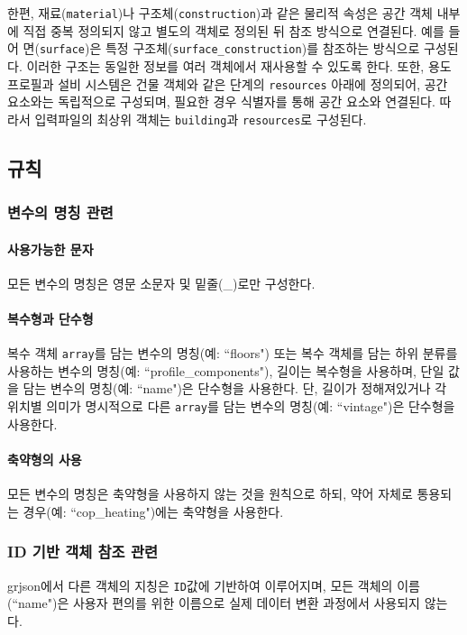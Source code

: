 한편, 재료(\texttt{material})나 구조체(\texttt{construction})과 같은 물리적 속성은 공간 객체 내부에 직접 중복 정의되지 않고 별도의 객체로 정의된 뒤 참조 방식으로 연결된다. 예를 들어 면(\texttt{surface})은 특정 구조체(\texttt{surface\_construction})를 참조하는 방식으로 구성된다. 이러한 구조는 동일한 정보를 여러 객체에서 재사용할 수 있도록 한다. 또한, 용도프로필과 설비 시스템은 건물 객체와 같은 단계의 \texttt{resources} 아래에 정의되어, 공간 요소와는 독립적으로 구성되며, 필요한 경우 식별자를 통해 공간 요소와 연결된다. 따라서 입력파일의 최상위 객체는 \texttt{building}과 \texttt{resources}로 구성된다.

\subsection{규칙}

\subsubsection{변수의 명칭 관련}

\paragraph{사용가능한 문자} 모든 변수의 명칭은 영문 소문자 및 밑줄(\_)로만 구성한다.

\paragraph{복수형과 단수형} 복수 객체 \texttt{array}를 담는 변수의 명칭(예: ``floors") 또는 복수 객체를 담는 하위 분류를 사용하는 변수의 명칭(예: ``profile\_components"), 길이는 복수형을 사용하며, 단일 값을 담는 변수의 명칭(예: ``name")은 단수형을 사용한다. 단, 길이가 정해져있거나 각 위치별 의미가 명시적으로 다른 \texttt{array}를 담는 변수의 명칭(예: ``vintage")은 단수형을 사용한다.

\paragraph{축약형의 사용} 모든 변수의 명칭은 축약형을 사용하지 않는 것을 원칙으로 하되, 약어 자체로 통용되는 경우(예: ``cop\_heating")에는 축약형을 사용한다.

\subsubsection{ID 기반 객체 참조 관련} \label{subsubsection:ioref:id_description}
grjson에서 다른 객체의 지칭은 \texttt{ID}값에 기반하여 이루어지며, 모든 객체의 이름(``name")은 사용자 편의를 위한 이름으로 실제 데이터 변환 과정에서 사용되지 않는다.

